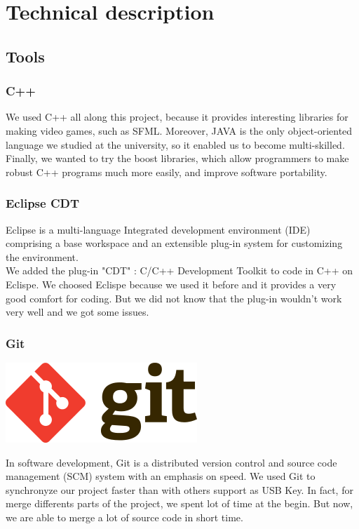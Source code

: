 \documentclass{scrreprt}
\begin{document}
			  \part{Technical description}
			  \chapter{Tools}
			  \section{C++}
			  We used C++ all along this project, because it provides interesting libraries for making video games, such as SFML.
			  Moreover, JAVA is the only object-oriented language we studied at the university, so it enabled us to become multi-skilled.
			  Finally, we wanted to try the boost libraries, which allow programmers to make robust C++ programs much more easily, and improve
			  software portability.
			  \section{Eclipse CDT}
			  Eclipse is a multi-language Integrated development environment (IDE) comprising a base workspace and an extensible plug-in system for customizing the environment.\\
				  We added the plug-in "CDT" : C/C++ Development Toolkit to code in C++ on Eclispe. We choosed Eclispe because we used it before and it provides a very good comfort for coding. But we did not know that the plug-in wouldn't work very well and we got some issues.
				  \section{Git}
				  \begin {center}
				  \includegraphics[scale=0.5]{Git.png}
				  \end{center}
				  In software development, Git is a distributed version control and source code management (SCM) system with an emphasis on speed.
				  We used Git to synchronyze our project faster than with others support as USB Key. In fact, for merge differents parts of the project, we spent lot of time at the begin. But now, we are able to merge a lot of source code in short time.\\
\end{document}
